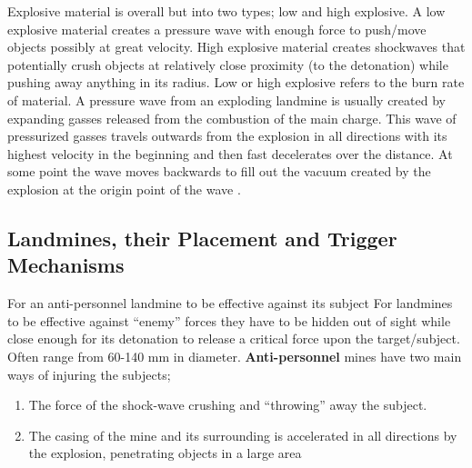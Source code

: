 Explosive material is overall but into two types; low and high explosive. A low explosive material creates a pressure wave with enough force to push/move objects possibly at great velocity. High explosive material creates shockwaves that potentially crush objects at relatively close proximity (to the detonation) while pushing away anything in its radius. Low or high explosive refers to the burn rate of material. A pressure wave from an exploding landmine is usually created by expanding gasses released from the combustion of the main charge. This wave of pressurized gasses travels outwards from the explosion in all directions with its highest velocity in the beginning and then fast decelerates over the distance. At some point the wave moves backwards to fill out the vacuum created by the explosion at the origin point of the wave \cite{Siegelbook}.

\subsection{Landmines, their Placement and Trigger Mechanisms}

For an anti-personnel landmine to be effective against its subject  
For landmines to be effective against “enemy” forces they have to be hidden out of sight while close enough for its detonation to release a critical force upon the target/subject. Often range from 60-140 mm in diameter. \textbf{Anti-personnel} mines have two main ways of injuring the subjects;
\begin{enumerate}
    \item The force of the shock-wave crushing and “throwing” away the subject.
    \item The casing of the mine and its surrounding is accelerated in all directions by the explosion, penetrating objects in a large area
\end{enumerate}

